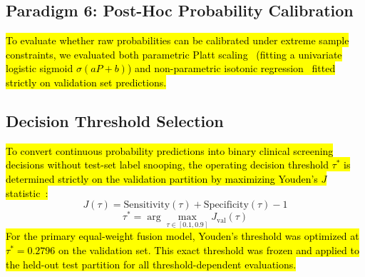 \documentclass[10pt,letterpaper]{article}
\begin{document}
        \subsection*{Paradigm 6: Post-Hoc Probability Calibration}
        \hl{To evaluate whether raw probabilities can be calibrated under extreme sample constraints, we evaluated both parametric Platt scaling~\cite{ref_platt} (fitting a univariate logistic sigmoid $\sigma(a P + b)$) and non-parametric isotonic regression~\cite{ref48} fitted strictly on validation set predictions.}

        \subsection*{Decision Threshold Selection}
        \hl{To convert continuous probability predictions into binary clinical screening decisions without test-set label snooping, the operating decision threshold $\tau^*$ is determined strictly on the validation partition by maximizing Youden's $J$ statistic~\cite{ref61}:}
        \begin{equation} \label{eq:youden}
        J(\tau) = \text{Sensitivity}(\tau) + \text{Specificity}(\tau) - 1
        \end{equation}
        \begin{equation} \label{eq:opt_threshold}
        \tau^* = \arg\max_{\tau \in [0.1, 0.9]} J_{\text{val}}(\tau)
        \end{equation}
        \hl{For the primary equal-weight fusion model, Youden's threshold was optimized at $\tau^* = 0.2796$ on the validation set. This exact threshold was frozen and applied to the held-out test partition for all threshold-dependent evaluations.}
\end{document}
